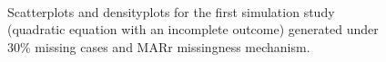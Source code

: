 \begin{figure}[ht!]
\begin{center}
{{				}
			}\\ 	
		\end{center}
		\caption{Scatterplots and densityplots for the first simulation study (quadratic equation with an incomplete outcome) generated under 30\% missing cases and MARr missingness mechanism.}
		\label{fig6_3}
	\end{figure}
	
